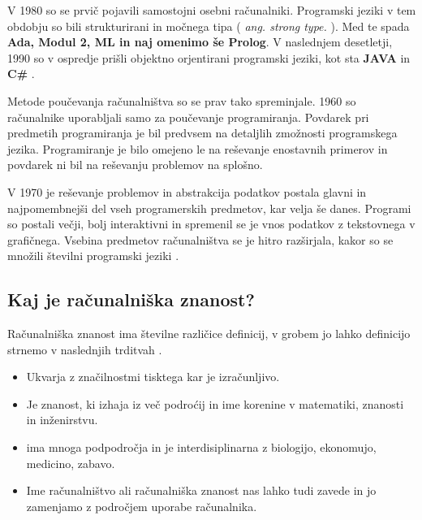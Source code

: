 V 1980 so se prvič pojavili samostojni osebni računalniki. Programski
jeziki v tem obdobju so bili strukturirani in močnega tipa (
\emph{ang.  strong type.} ). Med te spada \textbf{Ada, Modul 2, ML in
  naj omenimo še Prolog}. V naslednjem desetletji, 1990 so v ospredje
prišli objektno orjentirani programski jeziki, kot sta \textbf{JAVA}
in \textbf{C\#} \cite{thesisAWebP}.



Metode poučevanja računalništva so se prav tako spreminjale. 1960 so
računalnike uporabljali samo za poučevanje programiranja. Povdarek pri
predmetih programiranja je bil predvsem na detaljlih zmožnosti
programskega jezika. Programiranje je bilo omejeno le na reševanje
enostavnih primerov in povdarek ni bil na reševanju problemov na
splošno.

V 1970 je reševanje problemov in abstrakcija podatkov postala glavni
in najpomembnejši del vseh programerskih predmetov, kar velja še
danes.  Programi so postali večji, bolj interaktivni in spremenil se
je vnos podatkov z tekstovnega v grafičnega. Vsebina predmetov
računalništva se je hitro razširjala, kakor so se množili številni
programski jeziki \cite{thesisAWebP}.


\subsection{Kaj je računalniška znanost?}
\label{sec:kaj_je_računalniška_znanost}

Računalniška znanost ima številne različice definicij, v grobem jo
lahko definicijo strnemo v naslednjih trditvah \cite{guideTCS}.

\begin{itemize}
\item Ukvarja z značilnostmi tisktega kar je izračunljivo.
\item Je znanost, ki izhaja iz več podroćij in ime korenine v matematiki,
znanosti in inženirstvu.
\item ima mnoga podpodročja in je interdisiplinarna z biologijo,
ekonomujo, medicino, zabavo.
\item Ime računalništvo ali računalniška znanost nas lahko tudi zavede in
jo zamenjamo z področjem uporabe računalnika.
\end{itemize}

